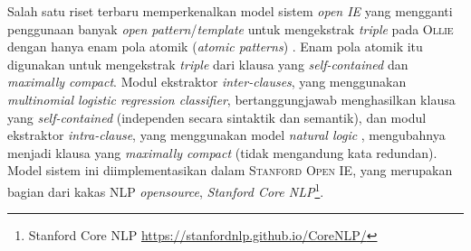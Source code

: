 Salah satu riset terbaru memperkenalkan model sistem \textit{open IE} yang mengganti penggunaan banyak \textit{open pattern}/\textit{template} untuk mengekstrak \textit{triple} pada \textsc{Ollie} \citep{schmitz2012open} dengan hanya enam pola atomik (\textit{atomic patterns}) \citep{angeli2015leveraging}. Enam pola atomik itu digunakan untuk mengekstrak \textit{triple} dari klausa yang \textit{self-contained} dan \textit{maximally compact}. Modul ekstraktor \textit{inter-clauses}, yang menggunakan \textit{multinomial logistic regression classifier}, bertanggungjawab menghasilkan klausa yang \textit{self-contained} (independen secara sintaktik dan semantik), dan modul ekstraktor \textit{intra-clause}, yang menggunakan model \textit{natural logic} \citep{maccartney2007natural}, mengubahnya menjadi klausa yang \textit{maximally compact} (tidak mengandung kata redundan). Model sistem ini diimplementasikan dalam \textsc{Stanford Open IE}, yang merupakan bagian dari kakas NLP \textit{opensource}, \textit{Stanford Core NLP}\footnote{Stanford Core NLP \url{https://stanfordnlp.github.io/CoreNLP/}}.
